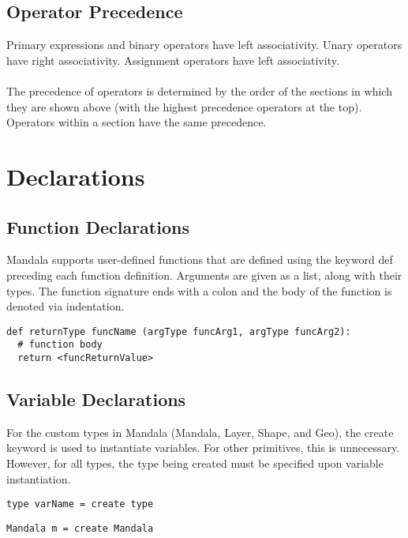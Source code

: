 \documentclass[12pt]{report}
\begin{document}
    \subsection*{Operator Precedence}
     Primary expressions and binary operators have left associativity. Unary operators have right associativity. Assignment operators have left associativity. \\ \\ The precedence of operators is determined by the order of the sections in which they are shown above (with the highest precedence operators at the top). Operators within a section have the same precedence. 

\newpage
{}
\section*{Declarations}

	\subsection*{Function Declarations}
    
    	Mandala supports user-defined functions that are defined using the keyword def preceding each function definition. Arguments are given as a list, along with their types. The function signature ends with a colon and the body of the function is denoted via indentation. 
        
\begin{verbatim}
def returnType funcName (argType funcArg1, argType funcArg2):
  # function body
  return <funcReturnValue>  
\end{verbatim}
    
    \subsection*{Variable Declarations}
    
    For the custom types in Mandala (Mandala, Layer, Shape, and Geo), the create keyword is used to instantiate variables. For other primitives, this is unnecessary. However, for all types, the type being created must be specified upon variable instantiation.

\begin{verbatim}
type varName = create type
\end{verbatim}

\begin{verbatim}
Mandala m = create Mandala
\end{verbatim}
\end{document}
